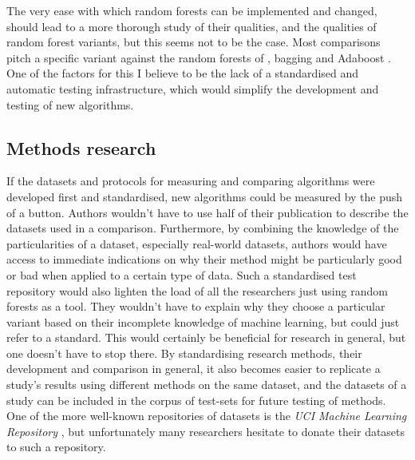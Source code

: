 \documentclass[a4paper,man,12pt,apacite,floatsintext,draftfirst]{apa6} %
\begin{document}
The very ease with which random forests can be implemented and changed,
should lead to a more thorough study of their qualities,
and the qualities of random forest variants, but this seems not to be the case.
Most comparisons pitch a specific variant against the random forests
of , bagging \cite{breiman1996bagging}
and Adaboost \cite{freund1995decision}.
One of the factors for this I believe to be the lack of a standardised
and automatic testing infrastructure, which would simplify the development
and testing of new algorithms.

\subsection{Methods research}
If the datasets and protocols for measuring and comparing algorithms were
developed first and standardised, new algorithms could be measured by the
push of a button.
Authors wouldn't have to use half of their publication
to describe the datasets used in a comparison.
Furthermore, by combining the knowledge of the particularities of a dataset,
especially real-world datasets, authors would have access to immediate
indications on why their method might be particularly good or bad when applied
to a certain type of data.
Such a standardised test repository would also lighten the load of all the
researchers just using random forests as a tool.
They wouldn't have to explain why they choose a particular variant based on
their incomplete knowledge of machine learning, but could just refer to
a standard.
This would certainly be beneficial for research in general, but one doesn't have
to stop there.
By standardising research methods, their development and comparison
in general, it also becomes easier to replicate a study's results using
different methods on the same dataset, and the datasets of a study can
be included in the corpus of test-sets for future testing of methods.
One of the more well-known repositories of datasets is the \emph{UCI Machine Learning Repository}
\cite{UCIrepo}, but unfortunately many researchers hesitate to donate their
datasets to such a repository.
\end{document}
